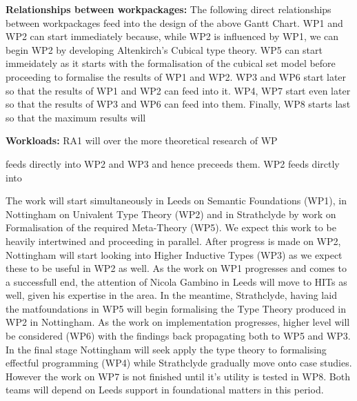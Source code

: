 \documentclass[a4paper,11pt]{article}
\begin{document}
\bigskip

{\bf Relationships between workpackages:} The following direct
relationships between workpackages feed into the design of the above
Gantt Chart. WP1 and WP2 can start immediately because, while WP2 is
influenced by WP1, we can begin WP2 by developing Altenkirch's Cubical
type theory. WP5 can start immeidately as it starts with the
formalisation of the cubical set model before proceeding to formalise
the results of WP1 and WP2. WP3 and WP6 start later so that the results of
WP1 and WP2 can feed into it. WP4, WP7 start even later so that the
results of WP3 and WP6 can feed into them. Finally, WP8 starts last so
that the maximum results will 


{\bf Workloads:} RA1 will over the more theoretical research of WP


 feeds directly into WP2 and WP3 and hence preceeds
them. WP2 feeds dirctly into 




The work will start simultaneously in Leeds on Semantic
Foundations (WP1), in Nottingham on Univalent Type Theory (WP2) and in
Strathclyde by work on Formalisation of the required Meta-Theory
(WP5). We expect this work to be heavily intertwined and proceeding in
parallel. After progress is made on WP2, Nottingham will start looking
into Higher Inductive Types (WP3) as we expect these to be useful in
WP2 as well. As the work on WP1 progresses and comes to a successfull
end, the attention of Nicola Gambino in Leeds will move to HITs as
well, given his expertise in the area. In the meantime, Strathclyde,
having laid the matfoundations in WP5 will begin formalising the Type
Theory produced in WP2 in Nottingham. As the work on implementation
progresses, higher level will be considered (WP6) with the findings
back propagating both to WP5 and WP3. In the final stage Nottingham
will seek apply the type theory to formalising effectful programming
(WP4) while Strathclyde gradually move onto case studies. However the
work on WP7 is not finished until it's utility is tested in WP8. Both
teams will depend on Leeds support in foundational matters in this period. 
\end{document}
